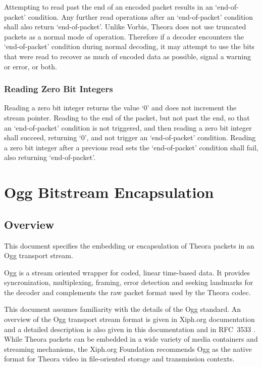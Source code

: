 \documentclass[11pt,letterpaper]{article}
\begin{document}
Attempting to read past the end of an encoded packet results in an
 `end-of-packet' condition.
Any further read operations after an `end-of-packet' condition shall also
 return `end-of-packet'.
Unlike Vorbis, Theora does not use truncated packets as a normal mode of
 operation.
Therefore if a decoder encounters the `end-of-packet' condition during normal
 decoding, it may attempt to use the bits that were read to recover as much of
 encoded data as possible, signal a warning or error, or both.

\subsubsection{Reading Zero Bit Integers}

Reading a zero bit integer returns the value `$0$' and does not increment
 the stream pointer.
Reading to the end of the packet, but not past the end, so that an
 `end-of-packet' condition is not triggered, and then reading a zero bit
 integer shall succeed, returning `$0$', and not trigger an `end-of-packet'
 condition.
Reading a zero bit integer after a previous read sets the `end-of-packet'
 condition shall fail, also returning `end-of-packet'.

\appendix

\section{Ogg Bitstream Encapsulation}
\label{app:oggencapsulation}

\subsection{Overview}

This document specifies the embedding or encapsulation of Theora packets
 in an Ogg transport stream.

Ogg is a stream oriented wrapper for coded, linear time-based data.
It provides syncronization, multiplexing, framing, error detection and
 seeking landmarks for the decoder and complements the raw packet format
 used by the Theora codec.

This document assumes familiarity with the details of the Ogg standard.
An overview of the Ogg transport stream format is given in Xiph.org
 documentation \cite{oggstream} and a detailed description is also given in
 this documentation \cite{oggframe} and in RFC~3533 \cite{rfc3533}.
While Theora packets can be embedded in a wide variety of media
 containers and streaming mechanisms, the Xiph.org Foundation
 recommends Ogg as the native format for Theora video in file-oriented
 storage and transmission contexts.
\end{document}

